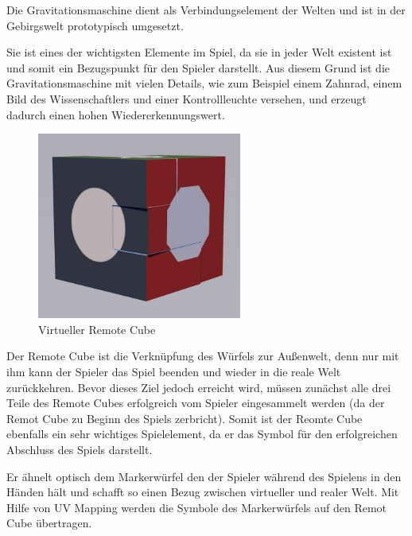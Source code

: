 Die Gravitationsmaschine dient als Verbindungselement der Welten und ist in der Gebirgswelt prototypisch umgesetzt.

Sie ist eines der wichtigsten Elemente im Spiel, da sie in jeder Welt existent ist und somit ein Bezugspunkt für den Spieler darstellt. Aus diesem Grund ist die Gravitationsmaschine mit vielen Details, wie zum Beispiel einem Zahnrad, einem Bild des Wissenschaftlers und einer Kontrollleuchte versehen, und  erzeugt dadurch einen hohen Wiedererkennungswert. 


\begin{figure}[!htbp]%
	\centering
		\includegraphics[width=0.6\textwidth]{images/RemoteCubeC4D}
	\caption{Virtueller Remote Cube}
	\label{fig:RemoteCube}
\end{figure}

Der Remote Cube ist die Verknüpfung des Würfels zur Außenwelt, denn nur mit ihm kann der Spieler das Spiel beenden und wieder in die reale Welt zurückkehren. Bevor dieses Ziel jedoch erreicht wird, müssen zunächst alle drei Teile des Remote Cubes erfolgreich vom Spieler eingesammelt werden (da der Remot Cube zu Beginn des Spiels zerbricht). Somit ist der Reomte Cube ebenfalls ein sehr wichtiges Spielelement, da er das Symbol für den erfolgreichen Abschluss des Spiels darstellt.

Er ähnelt optisch dem Markerwürfel den der Spieler während des Spielens in den Händen hält und schafft so einen Bezug zwischen virtueller und realer Welt. Mit Hilfe von UV Mapping werden die Symbole des Markerwürfels auf den Remot Cube übertragen.